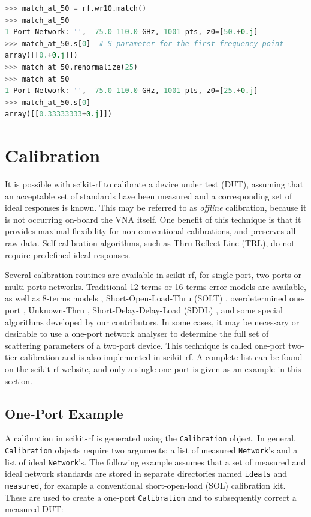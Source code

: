 \documentclass[journal, onecolumn]{IEEEtran}
\begin{document}
\begin{lstlisting}[language=Python]
>>> match_at_50 = rf.wr10.match()
>>> match_at_50
1-Port Network: '',  75.0-110.0 GHz, 1001 pts, z0=[50.+0.j]
>>> match_at_50.s[0]  # S-parameter for the first frequency point
array([[0.+0.j]])
>>> match_at_50.renormalize(25)
>>> match_at_50
1-Port Network: '',  75.0-110.0 GHz, 1001 pts, z0=[25.+0.j]
>>> match_at_50.s[0]
array([[0.33333333+0.j]])
\end{lstlisting}

\section{Calibration}
It is possible with scikit-rf to calibrate a device under test (DUT), assuming that an acceptable set of standards have been measured and a corresponding set of ideal responses is known. This may be referred to as \textit{offline} calibration, because it is not occurring on-board the VNA itself. One benefit of this technique is that it provides maximal flexibility for non-conventional calibrations, and preserves all raw data. Self-calibration algorithms, such as Thru-Reflect-Line (TRL)\cite{engen1979}, do not require predefined ideal responses.

Several calibration routines are available in scikit-rf, for single port, two-ports or multi-ports networks. Traditional 12-terms \cite{marks1997} or 16-terms \cite{silvonen1993} error models are available, as well as 8-terms models \cite{speciale1977}, Short-Open-Load-Thru (SOLT) \cite{kruppa1971}, overdetermined one-port \cite{bauer1974}, Unknown-Thru \cite{ferrero1992}, Short-Delay-Delay-Load (SDDL) \cite{liu2006}, and some special algorithms developed by our contributors. In some cases, it may be necessary or desirable to use a one-port network analyser to determine the full set of scattering parameters of a two-port device. This technique is called one-port two-tier calibration \cite{ou2005} and is also implemented in scikit-rf. A complete list can be found on the scikit-rf website, and only a single one-port is given as an example in this section.

\subsection{One-Port Example}
A calibration in scikit-rf is generated using the \texttt{Calibration} object. In general, \texttt{Calibration} objects require two arguments: a list of measured \texttt{Network}’s and a list of ideal \texttt{Network}’s. The following example assumes that a set of measured and ideal network standards are stored in separate directories named \texttt{ideals} and \texttt{measured}, for example a conventional short-open-load (SOL) calibration kit. These are used to create a one-port \texttt{Calibration} and to subsequently correct a measured DUT:
\end{document}
